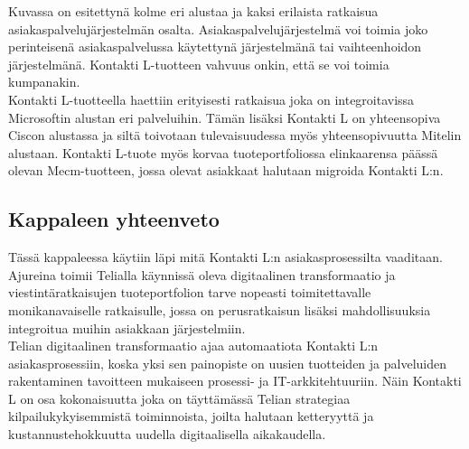 \documentclass[finnish,12pt,a4paper,pdftex]{article}
\begin{document}


Kuvassa on esitettynä kolme eri alustaa ja kaksi erilaista ratkaisua asiakaspalvelujärjestelmän osalta. Asiakaspalvelujärjestelmä voi toimia joko perinteisenä asiakaspalvelussa käytettynä järjestelmänä tai vaihteenhoidon järjestelmänä. Kontakti L-tuotteen vahvuus onkin, että se voi toimia kumpanakin.\\

Kontakti L-tuotteella haettiin erityisesti ratkaisua joka on integroitavissa Microsoftin alustan eri palveluihin. Tämän lisäksi Kontakti L on yhteensopiva Ciscon alustassa ja siltä toivotaan tulevaisuudessa myös yhteensopivuutta Mitelin alustaan. Kontakti L-tuote myös korvaa tuoteportfoliossa elinkaarensa päässä olevan Mecm-tuotteen, jossa olevat asiakkaat halutaan migroida Kontakti L:n. \\

\subsection{Kappaleen yhteenveto}

Tässä kappaleessa käytiin läpi mitä Kontakti L:n asiakasprosessilta vaaditaan. Ajureina toimii Telialla käynnissä oleva digitaalinen transformaatio ja viestintäratkaisujen tuoteportfolion tarve nopeasti toimitettavalle monikanavaiselle ratkaisulle, jossa on perusratkaisun lisäksi mahdollisuuksia integroitua muihin asiakkaan järjestelmiin.\\

Telian digitaalinen transformaatio ajaa automaatiota Kontakti L:n asiakasprosessiin, koska yksi sen painopiste on uusien tuotteiden ja palveluiden rakentaminen tavoitteen mukaiseen prosessi- ja IT-arkkitehtuuriin. Näin Kontakti L on osa kokonaisuutta joka on täyttämässä Telian strategiaa kilpailukykyisemmistä toiminnoista, joilta halutaan ketteryyttä ja kustannustehokkuutta uudella digitaalisella aikakaudella.\\
\end{document}
